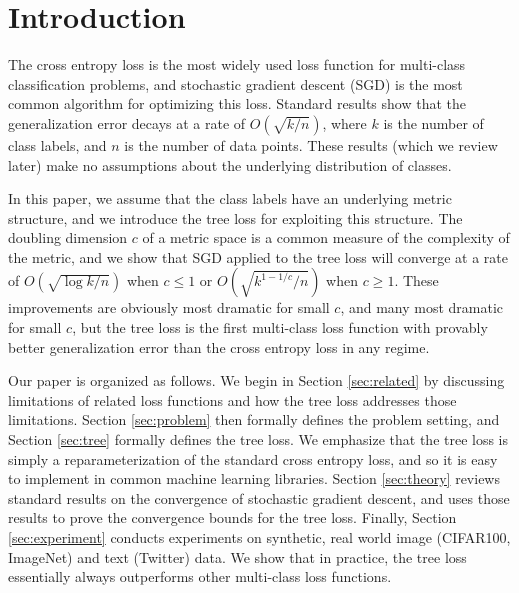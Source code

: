\documentclass[twoside]{article}
\begin{document}
\section{Introduction}


The cross entropy loss is the most widely used loss function for multi-class classification problems,
and stochastic gradient descent (SGD) is the most common algorithm for optimizing this loss.
Standard results show that the generalization error decays at a rate of $O(\sqrt{k/n})$,
where $k$ is the number of class labels,
and $n$ is the number of data points.
These results (which we review later) make no assumptions about the underlying distribution of classes.

In this paper,
we assume that the class labels have an underlying metric structure,
and we introduce the tree loss for exploiting this structure.
The doubling dimension $c$ of a metric space is a common measure of the complexity of the metric,
and we show that SGD applied to the tree loss will converge at a rate of $O(\sqrt{\log k/n})$ when $c\le 1$ or $O(\sqrt{k^{1-1/c}/n})$ when $c\ge 1$.
These improvements are obviously most dramatic for small $c$,
and many most dramatic for small $c$,
but the tree loss is the first multi-class loss function with provably better generalization error than the cross entropy loss in any regime.

Our paper is organized as follows.
We begin in Section \ref{sec:related} by discussing limitations of related loss functions and how the tree loss addresses those limitations.
Section \ref{sec:problem} then formally defines the problem setting, and Section \ref{sec:tree} formally defines the tree loss.
We emphasize that the tree loss is simply a reparameterization of the standard cross entropy loss,
and so it is easy to implement in common machine learning libraries.
Section \ref{sec:theory} reviews standard results on the convergence of stochastic gradient descent,
and uses those results to prove the convergence bounds for the tree loss.
Finally, Section \ref{sec:experiment} conducts experiments on synthetic, real world image (CIFAR100, ImageNet) and text (Twitter) data.
We show that in practice, the tree loss essentially always outperforms other multi-class loss functions.
\end{document}
